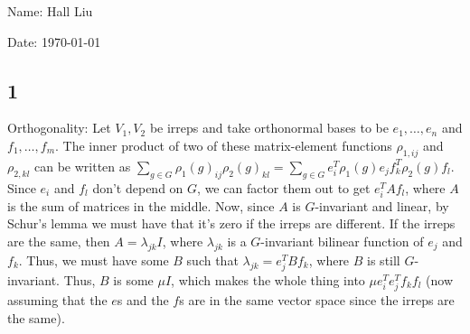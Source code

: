 \documentclass{article}
\begin{document}
Name: Hall Liu

Date: \today 
\vspace{1.5cm}
\subsection*{1}
Orthogonality: Let $V_1,V_2$ be irreps and take orthonormal bases to be $e_1,\ldots,e_n$ and $f_1,\ldots,f_m$. The inner product of two of these matrix-element functions $\rho_{1,ij}$ and $\rho_{2,kl}$ can be written as $\sum_{g\in G}\rho_1(g)_{ij}\rho_2(g)_{kl}=\sum_{g\in G}e_i^T\rho_1(g)e_jf_k^T\rho_2(g)f_l$. Since $e_i$ and $f_l$ don't depend on $G$, we can factor them out to get $e_i^TAf_l$, where $A$ is the sum of matrices in the middle. Now, since $A$ is $G$-invariant and linear, by Schur's lemma we must have that it's zero if the irreps are different. If the irreps are the same, then $A=\lambda_{jk}I$, where $\lambda_{jk}$ is a $G$-invariant bilinear function of $e_j$ and $f_k$. Thus, we must have some $B$ such that $\lambda_{jk}=e_j^TBf_k$, where $B$ is still $G$-invariant. Thus, $B$ is some $\mu I$, which makes the whole thing into $\mu e_i^Te_j^Tf_kf_l$ (now assuming that the $e$s and the $f$s are in the same vector space since the irreps are the same). 
\end{document}

